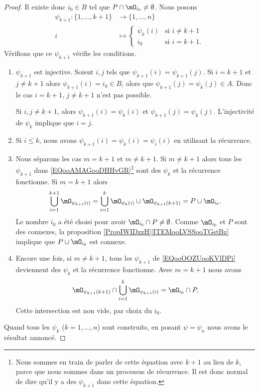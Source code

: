 \begin{proof}
	Il existe donc \( i_0\in B\) tel que \( P\cap\mO_{i_0}\neq \emptyset\). Nous posons
	\begin{equation}
		\begin{aligned}
			\psi_{k+1}\colon \{ 1,\ldots, k+1 \} & \to \{ 1,\ldots, n \}                    \\
			i                                    & \mapsto \begin{cases}
				                                               \psi_k(i) & \text{si } i\neq k+1 \\
				                                               i_0       & \text{si } i=k+1.
			                                               \end{cases}
		\end{aligned}
	\end{equation}
	Vérifions que ce \( \psi_{k+1}\) vérifie les conditions.
	\begin{enumerate}
		\item
		      \( \psi_{k+1}\) est injective. Soient \( i,j\) tels que \( \psi_{k+1}(i)=\psi_{k+1}(j)\). Si \( i=k+1\) et \( j\neq k+1\) alors \( \psi_{k+1}(i)=i_0\in B\), alors que \( \psi_{k+1}(j)=\psi_k(j)\in A\). Donc le cas \( i=k+1\), \( j\neq k+1\) n'est pas possible.

		      Si \( i,j\neq k+1\), alors \( \psi_{k+1}(i)=\psi_k(i)\) et \( \psi_{k+1}(j)=\psi_k(j)\). L'injectivité de \( \psi_k\) implique que \( i=j\).
		\item
		      Si \( i\leq k\), nous avons \( \psi_{k+1}(i)=\psi_k(i)=\psi_i(i)\) en utilisant la récurrence.
		\item
		      Nous séparons les cas \( m=k+1\) et \( m\neq k+1\). Si \( m\neq k+1\) alors tous les \( \psi_{k+1}\) dans \eqref{EQooAMAGooDHHvGR}\footnote{Nous sommes en train de parler de cette équation avec \( k+1\) au lieu de \( k\), parce que nous sommes dans un processus de récurrence. Il est donc normal de dire qu'il y a des \( \psi_{k+1}\) dans cette équation.} sont des \( \psi_k\) et la récurrence fonctionne. Si \( m=k+1\) alors
		      \begin{equation}
			      \bigcup_{i=1}^{k+1}\mO_{\psi_{k+1}(i)}=\bigcup_{i=1}^k\mO_{\psi_k(i)}\cup\mO_{\psi_{k+1}(k+1)}=P\cup\mO_{i_0}.
		      \end{equation}
		      Le nombre \( i_0\) a été choisi pour avoir \( \mO_{i_0}\cap P\neq \emptyset\). Comme \( \mO_{i_0} \) et \( P\) sont des connexes, la proposition \ref{PropIWIDzzH}\ref{ITEMooLVSSooTGstBz} implique que \( P\cup\mO_{i_0}\) est connexe.
		\item
		      Encore une fois, si \( m\neq k+1\), tous les \( \psi_{k+1}\) de \eqref{EQooOOZUooKVlDPi} deviennent des \( \psi_k\) et la récurrence fonctionne. Avec \( m=k+1\) nous avons
		      \begin{equation}
			      \mO_{\psi_{k+1}(k+1)}\cap\bigcup_{i=1}^k\mO_{\psi_{k+1}(i)}=\mO_{i_0}\cap P.
		      \end{equation}
		      Cette intersection est non vide, par choix du \( i_0\).
	\end{enumerate}
	Quand tous les \( \psi_k\) (\( k=1,\ldots, n\)) sont construits, en posant \( \psi=\psi_n\) nous avons le résultat annoncé.
\end{proof}

